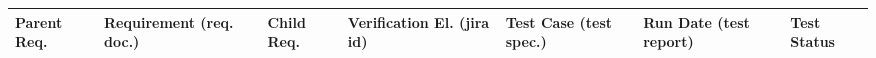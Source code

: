 \begin{longtable}[]{|p{1.5cm}|p{2.7cm}|p{1.5cm}|p{3.2cm}|p{1.5cm}|p{1.7cm}|p{1.5cm}|}
\hline
{\scriptsize \bf Parent Req.} & 
\begin{minipage}[t]{0.9\columnwidth}
{\small \bf Requirement}\newline
{\scriptsize (req. doc.)}
\end{minipage} &
{\scriptsize \bf Child Req.} &
\begin{minipage}[t]{0.9\columnwidth}
{\small \bf Verification El.}\newline
{\scriptsize (jira id)}
\end{minipage}&
\begin{minipage}[t]{0.9\columnwidth}
{\small \bf Test Case}\newline
{\scriptsize (test spec.)}
\end{minipage} &
\begin{minipage}[t]{0.9\columnwidth}
{\small \bf Run Date}\newline
{\scriptsize (test report)}
\end{minipage} &
{\bf Test Status} \\ \hline


\end{longtable}

